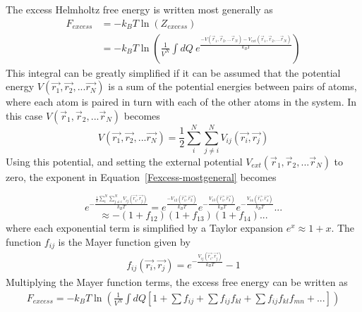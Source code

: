 \documentclass[double,12pt]{beavtex}
\begin{document}
The excess Helmholtz free energy is written most generally as
\begin{align}
      F_{excess} &= -k_{B}T\ln(Z_{excess}) \\
                 &= -k_BT\ln{\left(\frac{1}{V^N}\int{dQ}~e^\frac{-V(\vec{r}_1, \vec{r}_2,...\vec{r}_N)-V_{ext}(\vec{r}_1, \vec{r}_2,...\vec{r}_N)}{k_BT}\right)} \label{Fexcess-mostgeneral}
\end{align} 
This integral can be greatly simplified if it can be assumed that the 
potential energy $V(\vec{r_1},\vec{r_2},...\vec{r_N})$ is a sum of the 
potential energies between pairs of atoms, where each atom is paired in 
turn with each of the other atoms in the system. In this case 
$V(\vec{r}_1, \vec{r}_2,...\vec{r}_N)$ becomes 
\begin{equation}{V(\vec{r_1},\vec{r_2},...\vec{r_N})=\frac{1}{2}\sum^N_i\sum^N_{j\neq{i}}V_{ij}(\vec{r_i},\vec{r_j})}\end{equation} 
Using this potential, and setting the external potential 
$V_{ext}(\vec{r}_1, \vec{r}_2,...\vec{r}_N)$ to zero, the exponent in 
Equation~\ref{Fexcess-mostgeneral} becomes

\begin{equation}{e^{-\frac{\frac{1}{2}\sum^N_i\sum^N_{j\neq{i}}V_{ij}(\vec{r_i},\vec{r_j})}{k_BT}}=e^{\frac{-V_{12}(\vec{r_1},\vec{r_2})}{k_BT}}e^{-\frac{V_{13}(\vec{r_1},\vec{r_3})}{k_BT}}e^{-\frac{V_{14}(\vec{r_1},\vec{r_4})}{k_BT}}...}\end{equation}
\begin{equation}{\approx-(1+f_{12})(1+f_{13})(1+f_{14})...}\end{equation}
where each exponential term is simplified by a Taylor expansion $e^x\approx{1+x}$.  
The function $f_{ij}$ is the Mayer function given by
\begin{align}\label{eq:mayerfunction}
     f_{ij}(\vec{r_i},\vec{r_j})=e^{-\frac{V_{ij}(\vec{r_i},\vec{r_j})}{k_BT}}-1
\end{align} 
Multiplying the Mayer function terms, the excess free energy can be 
written as~\cite{schroeder}
\begin{align} \label{eq:Fexcess-simplified}
    F_{excess}=-k_BT\ln{\left(\frac{1}{V^N}\int{dQ}\left[1 + \sum{f_{ij}} + \sum{f_{ij}f_{kl}} +\sum{f_{ij}f_{kl}f_{mn}} +... \right]\right)}
\end{align}
\end{document}
